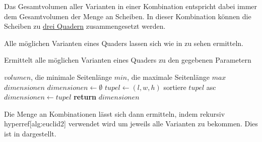 \documentclass[a4paper,10pt,ngerman]{scrartcl}
\begin{document}
    Das Gesamtvolumen aller Varianten in einer Kombination entspricht dabei immer dem Gesamtvolumen der Menge an Scheiben.
    In dieser Kombination können die Scheiben zu \hyperref[fig:figAB4]{drei Quadern} zusammengesetzt werden.

    Alle möglichen Varianten eines Quaders lassen sich wie in \hyperref[alg:euclid2]{} zu sehen ermitteln.

    \begin{algorithm}[H]
        \caption{Ermittelt alle möglichen Varianten eines Quaders zu den gegebenen Parametern}
        \label{alg:euclid2}
        \begin{algorithmic}[1]
            \Require $volumen$, die minimale Seitenlänge $min$, die maximale Seitenlänge $max$
            \Ensure $dimensionen$
                \State $dimensionen \gets \emptyset$
                                \State $tupel \gets (l, w, h)$
                                \State sortiere $tupel$ asc
                                \State $dimensionen \gets tupel$
                            \EndIf
                        \EndFor
                    \EndFor
                \EndFor
                \State \textbf{return} $dimensionen$
            \EndFunction
        \end{algorithmic}
    \end{algorithm}

    Die Menge an Kombinationen lässt sich dann ermitteln,
    indem rekursiv hyperref[alg:euclid2]{} verwendet wird um jeweils alle Varianten zu bekommen.
    Dies ist in \hyperref[alg:euclid2]{} dargestellt.
\end{document}
